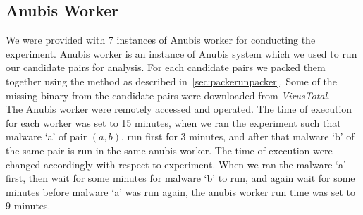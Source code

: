 \subsection{Anubis Worker}
\label{sub:Anubis Worker}
We were provided with 7 instances of Anubis worker for conducting the experiment.
Anubis worker is an instance of Anubis system which we used to run our candidate pairs for analysis.
For each candidate pairs we packed them together using the method as described in~\ref{sec:packerunpacker}.
Some of the missing binary from the candidate pairs were downloaded from \emph{VirusTotal}.\\
The Anubis worker were remotely accessed and operated. The time of execution for each worker was set to 15 minutes, when we ran the experiment such that malware `a' of pair $(a,b)$, run first for 3 minutes, and after that malware `b' of the same pair is run in the same anubis worker.
The time of execution were changed accordingly with respect to experiment.
When we ran the malware `a' first, then wait for some minutes for malware `b' to run, and again wait for some minutes before malware `a' was run again, the anubis worker run time was set to 9 minutes.
\\
